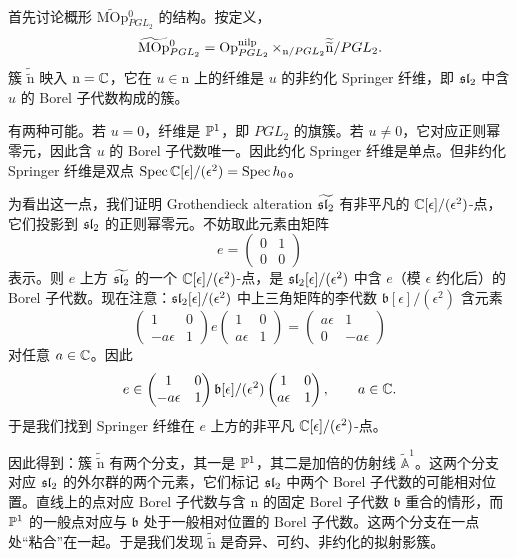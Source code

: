 首先讨论概形 $\widetilde{\mathrm{MOp}}{}^0_{PGL_2}$ 的结构。按定义，
\[
    \widetilde{\mathrm{MOp}}{}^0_{PGL_2}
    =\operatorname{Op}^{\mathrm{nilp}}_{PGL_2}
    \times_{\mathrm{n}/PGL_2}
    \widetilde{\widetilde{\mathrm{n}}}/PGL_2.
\]
簇 $\widetilde{\widetilde{\mathrm{n}}}$ 映入 $\mathrm{n}=\mathbb{C}$，它在 $u\in\mathrm{n}$ 上的纤维是 $u$ 的非约化 Springer 纤维，即 $\mathfrak{sl}_2$ 中含 $u$ 的 Borel 子代数构成的簇。

有两种可能。若 $u=0$，纤维是 $\mathbb{P}^1$，即 $PGL_2$ 的旗簇。若 $u\neq0$，它对应正则幂零元，因此含 $u$ 的 Borel 子代数唯一。因此约化 Springer 纤维是单点。但非约化 Springer 纤维是双点 $\operatorname{Spec}\mathbb{C}[\epsilon]/(\epsilon^2)=\operatorname{Spec} h_0$。

为看出这一点，我们证明 Grothendieck alteration $\widetilde{\mathfrak{sl}_2}$ 有非平凡的 $\mathbb{C}[\epsilon]/(\epsilon^2)$-点，它们投影到 $\mathfrak{sl}_2$ 的正则幂零元。不妨取此元素由矩阵
\[
    e=\begin{pmatrix}0&1\\0&0\end{pmatrix}
\]
表示。则 $e$ 上方 $\widetilde{\mathfrak{sl}_2}$ 的一个 $\mathbb{C}[\epsilon]/(\epsilon^2)$-点，是 $\mathfrak{sl}_2[\epsilon]/(\epsilon^2)$ 中含 $e$（模 $\epsilon$ 约化后）的 Borel 子代数。现在注意：$\mathfrak{sl}_2[\epsilon]/(\epsilon^2)$ 中上三角矩阵的李代数 $\mathfrak{b}[\epsilon]/(\epsilon^2)$ 含元素
\[
    \begin{pmatrix}1&0\\-a\epsilon&1\end{pmatrix}
    e
    \begin{pmatrix}1&0\\a\epsilon&1\end{pmatrix}
    =
    \begin{pmatrix}a\epsilon&1\\0&-a\epsilon\end{pmatrix}
\]
对任意 $a\in\mathbb{C}$。因此
\[
    e\in
    \begin{pmatrix}1&0\\-a\epsilon&1\end{pmatrix}
    \mathfrak{b}[\epsilon]/(\epsilon^2)
    \begin{pmatrix}1&0\\a\epsilon&1\end{pmatrix},
    \qquad a\in\mathbb{C}.
\]
于是我们找到 Springer 纤维在 $e$ 上方的非平凡 $\mathbb{C}[\epsilon]/(\epsilon^2)$-点。

因此得到：簇 $\widetilde{\widetilde{\mathrm{n}}}$ 有两个分支，其一是 $\mathbb{P}^1$，其二是加倍的仿射线 $\widetilde{\mathbb{A}}^1$。这两个分支对应 $\mathfrak{sl}_2$ 的外尔群的两个元素，它们标记 $\mathfrak{sl}_2$ 中两个 Borel 子代数的可能相对位置。直线上的点对应 Borel 子代数与含 $\mathrm{n}$ 的固定 Borel 子代数 $\mathfrak{b}$ 重合的情形，而 $\mathbb{P}^1$ 的一般点对应与 $\mathfrak{b}$ 处于一般相对位置的 Borel 子代数。这两个分支在一点处“粘合”在一起。于是我们发现 $\widetilde{\widetilde{\mathrm{n}}}$ 是奇异、可约、非约化的拟射影簇。

